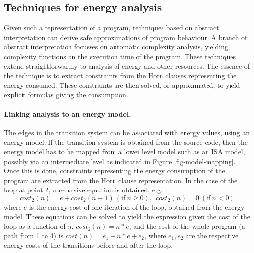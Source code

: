 %
%
%

\subsection{Techniques for energy analysis}

Given such a representation of a program, techniques based on abstract interpretation \cite{Cousot1977}
can derive safe approximations of program behaviour. A branch of abstract interpretation 
focusses on automatic complexity analysis, yielding complexity functions on the
execution time of the program.  These techniques extend straightforwardly to analysis of energy and
other resources. The essence of the technique is to extract constraints from the Horn clauses
representing the energy consumed. These constraints are then solved, or approximated, to yield explicit 
formulas giving the consumption.


 
\paragraph{Linking analysis to an energy model.} The edges in the transition system can be 
associated with energy values, using an energy model. If the transition system is obtained
from the source code, then the energy model has to be mapped from a lower level model
such as an ISA model, possibly via an intermediate level as indicated in Figure \ref{fig-model-mapping}. 
Once this is done, constraints
representing the energy consumption of the program are extracted from the Horn clause 
representation. In the case of the loop at point 2, a recursive equation is obtained, e.g.
\[ cost_2(n) = e + cost_2(n-1)~ (\mathrm{if}~n\ge 0), ~~cost_2(n) = 0 ~ (\mathrm{if}~n < 0) \]
where $e$ is the energy cost of one iteration of the loop, obtained from the energy model. These
equations can be solved to yield the expression given the cost of the loop as a function of $n$, 
$cost_2(n) = n*e$, and the cost of the whole 
program (a path from 1 to 4) is $cost(n) = e_1 + n*e + e_2$, where $e_1, e_2$ are the respective
energy costs of the transitions before and after the loop.
